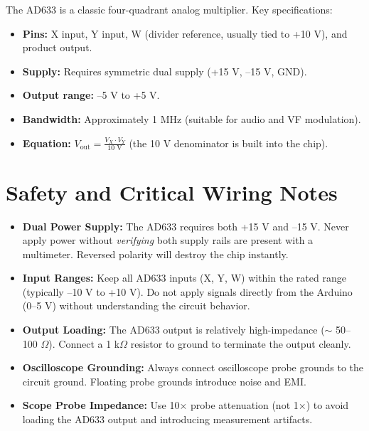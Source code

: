 \documentclass[11pt,letterpaper]{article}
\begin{document}
The AD633 is a classic four-quadrant analog multiplier. Key specifications:
\begin{itemize}
    \item \textbf{Pins:} X input, Y input, W (divider reference, usually tied to +10 V), and product output.
    \item \textbf{Supply:} Requires symmetric dual supply (+15 V, --15 V, GND).
    \item \textbf{Output range:} --5 V to +5 V.
    \item \textbf{Bandwidth:} Approximately 1 MHz (suitable for audio and VF modulation).
    \item \textbf{Equation:} $V_{\text{out}} = \frac{V_X \cdot V_Y}{10 \text{ V}}$ (the 10 V denominator is built into the chip).
\end{itemize}

\clearpage

\section{Safety and Critical Wiring Notes}

\begin{itemize}
    \item \textbf{Dual Power Supply:} The AD633 requires both +15 V and --15 V. Never apply power without \textit{verifying} both supply rails are present with a multimeter. Reversed polarity will destroy the chip instantly.
    \item \textbf{Input Ranges:} Keep all AD633 inputs (X, Y, W) within the rated range (typically --10 V to +10 V). Do not apply signals directly from the Arduino (0--5 V) without understanding the circuit behavior.
    \item \textbf{Output Loading:} The AD633 output is relatively high-impedance ($\sim$ 50--100 $\Omega$). Connect a 1 k$\Omega$ resistor to ground to terminate the output cleanly.
    \item \textbf{Oscilloscope Grounding:} Always connect oscilloscope probe grounds to the circuit ground. Floating probe grounds introduce noise and EMI.
    \item \textbf{Scope Probe Impedance:} Use 10× probe attenuation (not 1×) to avoid loading the AD633 output and introducing measurement artifacts.
\end{itemize}

\clearpage
\end{document}
